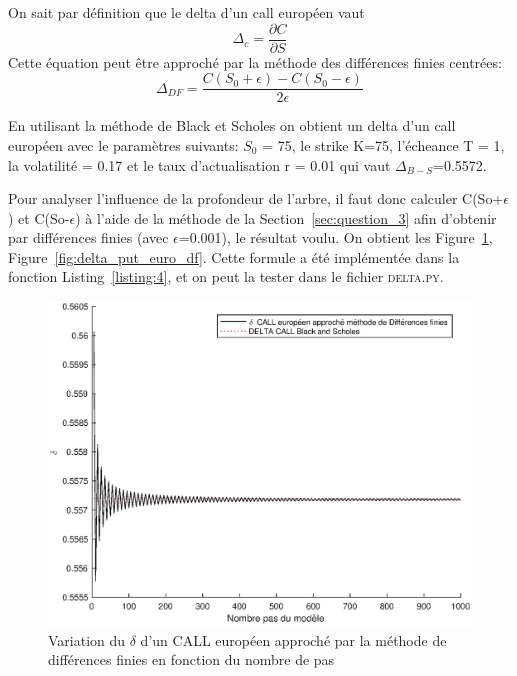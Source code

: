 On sait par définition que le delta d'un call européen vaut \[\Delta_{c}=\frac {\partial C}{\partial S}\]
Cette équation peut être approché par la méthode des différences finies centrées: \[\Delta_{DF}=\frac{C(S_{0} + \epsilon)-C(S_{0}-\epsilon)}{2\epsilon}\]

En utilisant la méthode de Black et Scholes on obtient un delta d’un call européen avec le paramètres suivants: $S_{0}$ = 75, le strike K=75, l’écheance T = 1, la volatilité  = 0.17 et le taux d’actualisation r = 0.01 qui vaut $\Delta_{B-S}$=0.5572.

Pour analyser l’influence de la profondeur de l’arbre, il faut donc calculer C(So+$\epsilon$) et C(So-$\epsilon$) à l’aide de la méthode de la Section~\ref{sec:question_3} afin d'obtenir par différences finies (avec $\epsilon$=0.001), le résultat voulu. On obtient les Figure~\ref{fig:delta_call_euro_df}, Figure~\ref{fig:delta_put_euro_df}. Cette formule a été implémentée dans la fonction Listing~\ref{listing:4}, et on peut la tester dans le fichier \textsc{delta.py}.




\begin{figure}[H]
\centering
\includegraphics[scale=0.6]{./img/DELTA_CALL_EURO_DF-BS.eps}
\caption{Variation du $\delta$ d'un CALL européen approché par la méthode de différences finies en fonction du nombre de pas}
\label{fig:delta_call_euro_df}
\end{figure}

